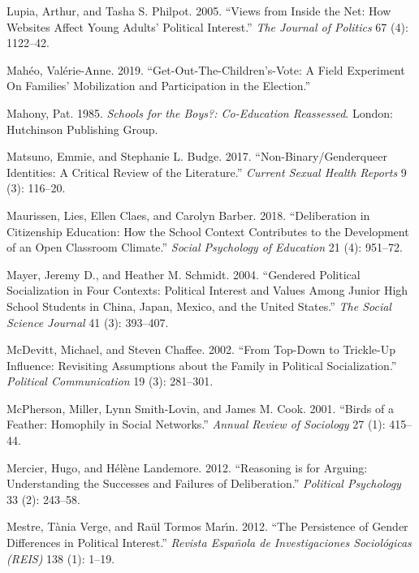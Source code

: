 \documentclass[
  letterpaper,
  DIV=11,
  numbers=noendperiod]{scrreprt}
\newlength{\cslhangindent}
\newlength{\cslentryspacingunit} %
\newenvironment{CSLReferences}[2] %
 {%
  \setlength{\parindent}{0pt}
  \ifodd #1
  \let\oldpar\par
  \def\par{\hangindent=\cslhangindent\oldpar}
  \fi
  \setlength{\parskip}{#2\cslentryspacingunit}
 }%
 {}
\begin{document}
\begin{CSLReferences}{1}{0}
\leavevmode{}%
Lupia, Arthur, and Tasha S. Philpot. 2005. {``{Views from Inside the
Net: How Websites Affect Young Adults' Political Interest}.''} \emph{The
Journal of Politics} 67 (4): 1122--42.

\leavevmode{}%
Mahéo, Valérie-Anne. 2019. {``{Get-Out-The-Children's-Vote: A Field
Experiment On Families' Mobilization and Participation in the
Election}.''}

\leavevmode{}%
Mahony, Pat. 1985. \emph{{Schools for the Boys?: Co-Education
Reassessed}}. London: Hutchinson Publishing Group.

\leavevmode{}%
Matsuno, Emmie, and Stephanie L. Budge. 2017. {``{Non-Binary/Genderqueer
Identities: A Critical Review of the Literature}.''} \emph{Current
Sexual Health Reports} 9 (3): 116--20.

\leavevmode{}%
Maurissen, Lies, Ellen Claes, and Carolyn Barber. 2018. {``{Deliberation
in Citizenship Education: How the School Context Contributes to the
Development of an Open Classroom Climate}.''} \emph{Social Psychology of
Education} 21 (4): 951--72.

\leavevmode{}%
Mayer, Jeremy D., and Heather M. Schmidt. 2004. {``{Gendered Political
Socialization in Four Contexts: Political Interest and Values Among
Junior High School Students in China, Japan, Mexico, and the United
States}.''} \emph{The Social Science Journal} 41 (3): 393--407.

\leavevmode{}%
McDevitt, Michael, and Steven Chaffee. 2002. {``{From Top-Down to
Trickle-Up Influence: Revisiting Assumptions about the Family in
Political Socialization}.''} \emph{Political Communication} 19 (3):
281--301.

\leavevmode{}%
McPherson, Miller, Lynn Smith-Lovin, and James M. Cook. 2001. {``{Birds
of a Feather: Homophily in Social Networks}.''} \emph{Annual Review of
Sociology} 27 (1): 415--44.

\leavevmode{}%
Mercier, Hugo, and Hélène Landemore. 2012. {``{Reasoning is for Arguing:
Understanding the Successes and Failures of Deliberation}.''}
\emph{Political Psychology} 33 (2): 243--58.

\leavevmode{}%
Mestre, Tània Verge, and Raül Tormos Marı́n. 2012. {``{The Persistence of
Gender Differences in Political Interest}.''} \emph{Revista Espa{ñ}ola
de Investigaciones Sociol{ó}gicas (REIS)} 138 (1): 1--19.


\end{CSLReferences}
\end{document}
